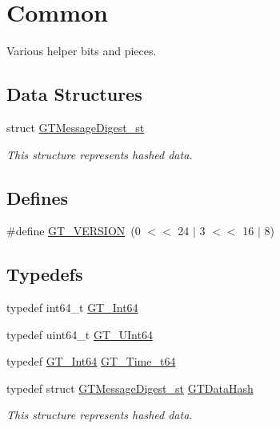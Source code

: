 \hypertarget{group__common}{
\section{Common}
\label{group__common}
}


Various helper bits and pieces.  


\subsection*{Data Structures}
\begin{DoxyCompactItemize}
\item 
struct \hyperlink{struct_g_t_message_digest__st}{GTMessageDigest\_\-st}
\begin{DoxyCompactList}\small\item\em This structure represents hashed data. \item\end{DoxyCompactList}\end{DoxyCompactItemize}
\subsection*{Defines}
\begin{DoxyCompactItemize}
\item 
\#define \hyperlink{group__common_gafdac78985a08fc5052b1d1f2888a25c9}{GT\_\-VERSION}~(0 $<$$<$ 24 $|$ 3 $<$$<$ 16 $|$ 8)
\end{DoxyCompactItemize}
\subsection*{Typedefs}
\begin{DoxyCompactItemize}
\item 
typedef int64\_\-t \hyperlink{group__common_ga0c05c3a051f674d7bf4df22831a3b5f3}{GT\_\-Int64}
\item 
typedef uint64\_\-t \hyperlink{group__common_gab05f0d6e953c4aee143ec3063384dd77}{GT\_\-UInt64}
\item 
typedef \hyperlink{group__common_ga0c05c3a051f674d7bf4df22831a3b5f3}{GT\_\-Int64} \hyperlink{group__common_ga4cc54826c21e0ed438d8e35be7039328}{GT\_\-Time\_\-t64}
\item 
typedef struct \hyperlink{struct_g_t_message_digest__st}{GTMessageDigest\_\-st} \hyperlink{group__common_ga96461884b56b666a19e99b5c872eb2a6}{GTDataHash}
\begin{DoxyCompactList}\small\item\em This structure represents hashed data. \item\end{DoxyCompactList}\end{DoxyCompactItemize}
